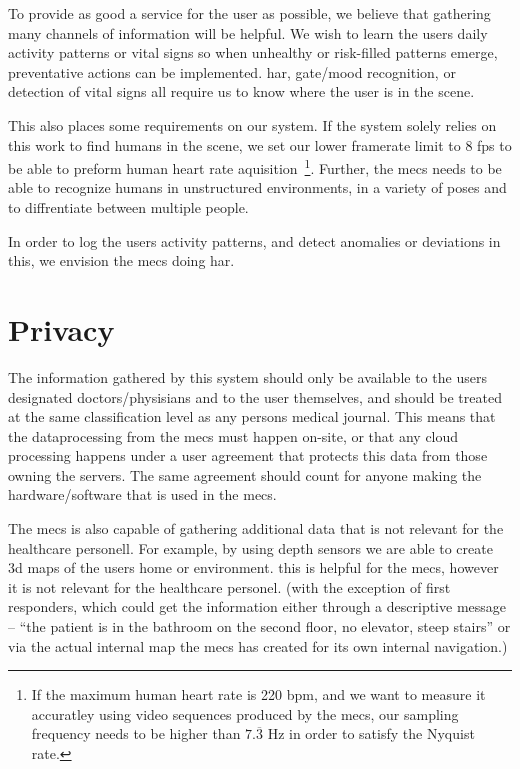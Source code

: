 To provide as good a service for the user as possible, we believe that gathering many channels of information will be helpful. We wish to learn the users daily activity patterns or vital signs so when unhealthy or risk-filled patterns emerge, preventative actions can be implemented. \gls{har}, gate/mood recognition, or detection of vital signs all require us to know where the user is in the scene.

This also places some requirements on our system. If the system solely relies on this work to find humans in the scene, we set our lower framerate limit to 8 fps to be able to preform human heart rate aquisition~\cite{Wu12Eulerian}\footnote{If the maximum human heart rate is 220 bpm, and we want to measure it accuratley using video sequences produced by the \gls{mecs}, our sampling frequency needs to be higher than $7.\overline{3}$ Hz in order to satisfy the Nyquist rate.}. Further, the \gls{mecs} needs to be able to recognize humans in unstructured environments, in a variety of poses and to diffrentiate between multiple people.

In order to log the users activity patterns, and detect anomalies or deviations in this, we envision the \gls{mecs} doing \gls{har}.

\section{Privacy}
The information gathered by this system should only be available to the users designated doctors/physisians and to the user themselves, and should be treated at the same classification level as any persons medical journal. This means that the dataprocessing from the \gls{mecs} must happen on-site, or that any cloud processing happens under a user agreement that protects this data from those owning the servers. The same agreement should count for anyone making the hardware/software that is used in the \gls{mecs}.

The \gls{mecs} is also capable of gathering additional data that is not relevant for the healthcare personell. For example, by using depth sensors we are able to create 3d maps of the users home or environment. this is helpful for the \gls{mecs}, however it is not relevant for the healthcare personel. (with the exception of first responders, which could get the information either through a descriptive message -- ``the patient is in the bathroom on the second floor, no elevator, steep stairs'' or via the actual internal map the \gls{mecs} has created for its own internal navigation.)

